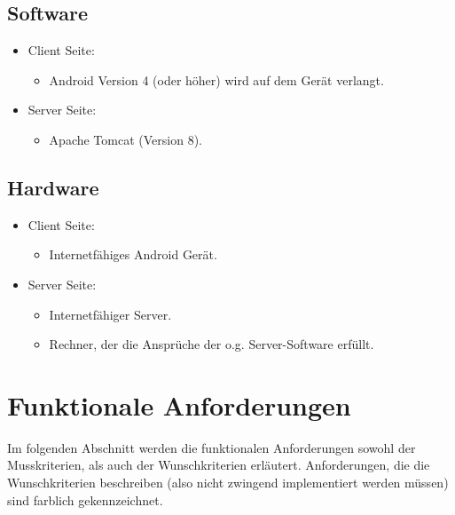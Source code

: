 \documentclass[parskip=full]{scrartcl}
\begin{document}
\subsection{Software}
\begin{itemize}
	\item Client Seite:
	\begin{itemize}
		\item Android Version 4 (oder höher) wird auf dem Gerät verlangt.
	\end{itemize}
	
	\item Server Seite:
	\begin{itemize} 
        \item Apache Tomcat (Version 8).
    \end{itemize}
\end{itemize}


\subsection{Hardware}
\begin{itemize}
	\item Client Seite:
	\begin{itemize} 
		\item Internetfähiges Android Gerät. %
	\end{itemize}
	
	\item Server Seite:
	\begin{itemize}
		\item Internetfähiger Server.
		\item Rechner, der die Ansprüche der o.g. Server-Software erfüllt.
	\end{itemize}		
\end{itemize}

\newpage

\section{Funktionale Anforderungen}
Im folgenden Abschnitt werden die funktionalen Anforderungen sowohl der Musskriterien, als auch der Wunschkriterien erläutert. Anforderungen, die die Wunschkriterien beschreiben (also nicht zwingend implementiert werden müssen) sind \colorbox{shadecolor}{farblich gekennzeichnet}.
\end{document}
